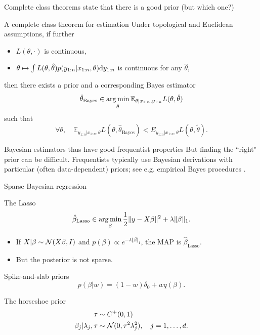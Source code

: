 \documentclass[10pt]{beamer}
\begin{document}
\begin{frame}{Complete class theorems state that there is a good prior (but which one?)}

\begin{block}{A complete class theorem for estimation \citep{Ber85}}
Under topological and Euclidean assumptions, if further \begin{itemize}
\item $L(\theta,\cdot)$ is continuous,
\item $\theta\mapsto \int L(\theta,\hat\theta)p(y_{1:n} \vert x_{1:n}, \theta){\rm d} y_{1:n}$ is continuous for any $\hat\theta$,
\end{itemize}
then  there exists a prior and a corresponding Bayes estimator
$$
\hat\theta_{\text{Bayes}} \in \operatorname*{arg\,min}_{\hat\theta} \mathbb{E}_{\theta\vert x_{1:n},y_{1:n}} L(\theta,\hat\theta)
$$
such that
$$ \forall \theta, \quad \mathbb E_{y_{1:n}\vert x_{1:n},\theta} L(\theta,\hat\theta_{\text{Bayes}}) < E_{y_{1:n}\vert x_{1:n},\theta} L(\theta,\tilde\theta).$$
\end{block}
\begin{alertblock}{Bayesian estimators thus have good frequentist properties}
But finding the ``right" prior can be difficult. Frequentists typically use Bayesian derivations with particular (often data-dependent) priors; see e.g. empirical Bayes procedures \citep{Efr10}.
\end{alertblock}
\end{frame}

\begin{frame}{Sparse Bayesian regression}
\begin{block}{The Lasso}
$$ 
\hat\beta_{\text{Lasso}} \in \operatorname*{arg\,min}_\beta \frac12 \Vert y -X\beta\Vert^2 + \lambda \Vert \beta\Vert_1.
$$
\end{block}
\begin{itemize}
\item If $X\vert\beta \sim \mathcal{N}(X\beta, I)$ and $p(\beta) \propto e^{-\lambda\Vert \beta\Vert_1}$, the MAP is $\hat\beta_{\text{Lasso}}$.
\item But the posterior is not sparse.
\end{itemize}
\begin{block}{Spike-and-slab priors}
  \vspace{-5pt}
  $$
    p(\beta\vert w) = (1-w)\delta_0 + w q(\beta).
  $$
\end{block}

\begin{block}{The horseshoe prior}
  \vspace{-15pt}
  \begin{align*}
    \tau& \sim C^+(0,1)\\
    \beta_j\vert \lambda_j, \tau &\sim \mathcal{N}(0, \tau^2 \lambda_j^2), \quad j=1,\dots, d.
  \end{align*}
\end{block}
\end{frame}
\end{document}
